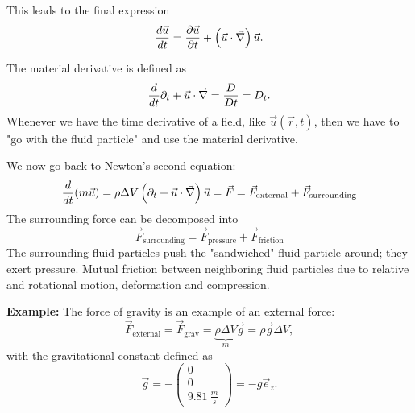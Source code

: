 This leads to the final expression
\begin{equation}
\frac{d \vec{u}}{d t} = \frac{\partial \vec{u}}{\partial t} + \left(\vec{u}\cdot\vec{\nabla}\right)\vec{u}.
\end{equation}
\begin{framed}
The material derivative is defined as
\begin{equation}
\frac{d }{d t}\partial_t+\vec{u}\cdot\vec{\nabla}=\frac{D}{Dt}=D_t.
\end{equation}
Whenever we have the time derivative of a field, like $\vec{u}(\vec{r},t)$, then we have to "go with the fluid particle" and use the material derivative.
\end{framed}
We now go back to Newton's second equation:
\begin{equation}
\frac{d }{d t}(m\vec{u}) = \rho\Delta V\left(\partial_t + \vec{u}\cdot\vec{\nabla}\right)\vec{u} = \vec{F} = \vec{F}_\mathrm{external} + \vec{F}_\mathrm{surrounding}
\end{equation}
The surrounding force can be decomposed into
\begin{equation}
\vec{F}_\mathrm{surrounding} = \vec{F}_\mathrm{pressure} + \vec{F}_\mathrm{friction}
\end{equation}
The surrounding fluid particles push the "sandwiched" fluid particle around; they exert pressure. Mutual friction between neighboring fluid particles due to relative and rotational motion, deformation and compression.

\begin{framed}
\textbf{Example:} The force of gravity is an example of an external force:
\begin{equation}
\vec{F}_\text{external} = \vec{F}_\text{grav} = \underbrace{\rho\Delta V}_m\vec{g}=\rho\vec{g}\Delta V,
\end{equation}
with the gravitational constant defined as
\begin{equation}
\vec{g} = -\begin{pmatrix}
0\\0\\\SI{9.81}{\frac{m}{s}}
\end{pmatrix} = -g\vec{e}_z.
\end{equation}
\end{framed}

